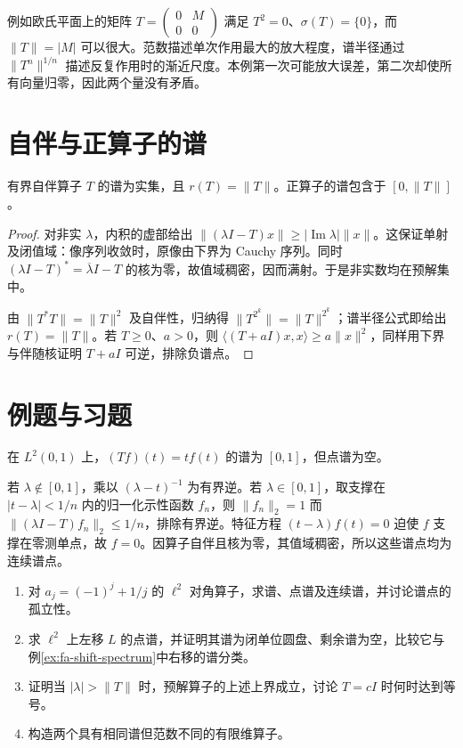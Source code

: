 \documentclass[UTF8,12pt,a4paper,fontset=fandol]{ctexbook}
\begin{document}
例如欧氏平面上的矩阵 $T=\begin{pmatrix}0&M\\0&0\end{pmatrix}$ 满足 $T^2=0$、$\sigma(T)=\{0\}$，而 $\|T\|=|M|$ 可以很大。范数描述单次作用最大的放大程度，谱半径通过 $\|T^n\|^{1/n}$ 描述反复作用时的渐近尺度。本例第一次可能放大误差，第二次却使所有向量归零，因此两个量没有矛盾。

\section{自伴与正算子的谱}
\begin{proposition}\label{prop:fa-selfadjoint-spectrum}
有界自伴算子 $T$ 的谱为实集，且 $r(T)=\|T\|$。正算子的谱包含于 $[0,\|T\|]$。
\end{proposition}
\begin{proof}
对非实 $\lambda$，内积的虚部给出 $\|(\lambda I-T)x\|\geq|\operatorname{Im}\lambda|\|x\|$。这保证单射及闭值域：像序列收敛时，原像由下界为 Cauchy 序列。同时 $(\lambda I-T)^*=\overline\lambda I-T$ 的核为零，故值域稠密，因而满射。于是非实数均在预解集中。

由 $\|T^*T\|=\|T\|^2$ 及自伴性，归纳得 $\|T^{2^k}\|=\|T\|^{2^k}$；谱半径公式即给出 $r(T)=\|T\|$。若 $T\geq0$、$a>0$，则 $\langle(T+aI)x,x\rangle\geq a\|x\|^2$，同样用下界与伴随核证明 $T+aI$ 可逆，排除负谱点。
\end{proof}

\section{例题与习题}
\begin{example}[谱点不必是特征值]\label{ex:fa-multiplication-spectrum}
在 $L^2(0,1)$ 上，$(Tf)(t)=tf(t)$ 的谱为 $[0,1]$，但点谱为空。
\end{example}
\begin{solve}
若 $\lambda\notin[0,1]$，乘以 $(\lambda-t)^{-1}$ 为有界逆。若 $\lambda\in[0,1]$，取支撑在 $|t-\lambda|<1/n$ 内的归一化示性函数 $f_n$，则 $\|f_n\|_2=1$ 而 $\|(\lambda I-T)f_n\|_2\leq1/n$，排除有界逆。特征方程 $(t-\lambda)f(t)=0$ 迫使 $f$ 支撑在零测单点，故 $f=0$。因算子自伴且核为零，其值域稠密，所以这些谱点均为连续谱点。
\end{solve}
\begin{enumerate}
 \item 对 $a_j=(-1)^j+1/j$ 的 $\ell^2$ 对角算子，求谱、点谱及连续谱，并讨论谱点的孤立性。
 \item 求 $\ell^2$ 上左移 $L$ 的点谱，并证明其谱为闭单位圆盘、剩余谱为空，比较它与例\ref{ex:fa-shift-spectrum}中右移的谱分类。
 \item 证明当 $|\lambda|>\|T\|$ 时，预解算子的上述上界成立，讨论 $T=cI$ 时何时达到等号。
 \item 构造两个具有相同谱但范数不同的有限维算子。
\end{enumerate}
\end{document}
